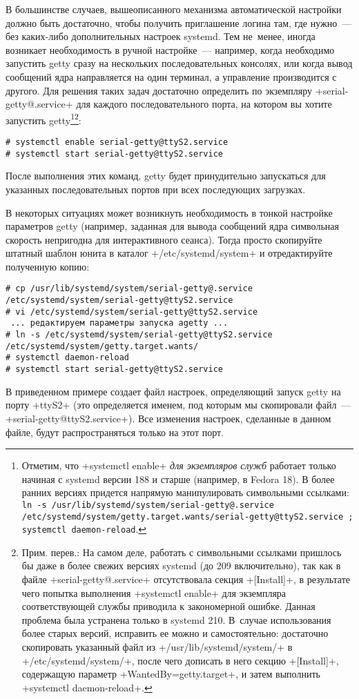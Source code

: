 \documentclass[10pt,oneside,a4paper]{article}
\begin{document}
В большинстве случаев, вышеописанного механизма автоматической настройки должно
быть достаточно, чтобы получить приглашение логина там, где нужно~--- без
каких-либо дополнительных настроек systemd. Тем не~менее, иногда возникает
необходимость в ручной настройке~--- например, когда необходимо запустить getty
сразу на нескольких последовательных консолях, или когда вывод сообщений ядра
направляется на один терминал, а управление производится с другого. Для решения
таких задач достаточно определить по экземпляру +serial-getty@.service+ для
каждого последовательного порта, на котором вы хотите запустить
getty\footnote{Отметим, что +systemctl enable+ \emph{для экземпляров служб}
работает только начиная с systemd версии 188 и старше (например, в Fedora 18). В
более ранних версиях придется напрямую манипулировать символьными ссылками:
\texttt{ln -s /usr/lib/systemd/system/serial-getty@.service
/etc/systemd/system/getty.target.wants/serial-getty@ttyS2.service ; systemctl
daemon-reload}.}\footnote{\label{ftn:enableserial}Прим. перев.: На самом деле,
работать с символьными ссылками пришлось бы даже в более свежих версиях 
systemd (до 209 включительно), так как в файле +serial-getty@.service+
отсутствовала секция +[Install]+, в результате чего попытка выполнения
+systemctl enable+ для экземпляра соответствующей службы приводила к
закономерной ошибке. Данная проблема была устранена только в systemd 210. 
В~случае использования более старых версий, исправить ее можно и самостоятельно:
достаточно скопировать указанный файл из +/usr/lib/systemd/system/+ в
+/etc/systemd/system/+, после чего дописать в него секцию +[Install]+,
содержащую параметр +WantedBy=getty.target+, и затем выполнить 
+systemctl daemon-reload+.}:
\begin{Verbatim}
# systemctl enable serial-getty@ttyS2.service
# systemctl start serial-getty@ttyS2.service
\end{Verbatim}
После выполнения этих команд, getty будет принудительно запускаться для
указанных последовательных портов при всех последующих загрузках.

В некоторых ситуациях может возникнуть необходимость в тонкой настройке
параметров getty (например, заданная для вывода сообщений ядра символьная
скорость непригодна для интерактивного сеанса). Тогда просто скопируйте штатный
шаблон юнита в каталог +/etc/systemd/system+ и отредактируйте полученную копию:
\begin{Verbatim}
# cp /usr/lib/systemd/system/serial-getty@.service /etc/systemd/system/serial-getty@ttyS2.service
# vi /etc/systemd/system/serial-getty@ttyS2.service
 ... редактируем параметры запуска agetty ...
# ln -s /etc/systemd/system/serial-getty@ttyS2.service /etc/systemd/system/getty.target.wants/
# systemctl daemon-reload
# systemctl start serial-getty@ttyS2.service
\end{Verbatim}
В приведенном примере создает файл настроек, определяющий запуск getty на порту
+ttyS2+ (это определяется именем, под которым мы скопировали файл~---
+serial-getty@ttyS2.service+). Все изменения настроек, сделанные в данном файле,
будут распространяться только на этот порт.
\end{document}
